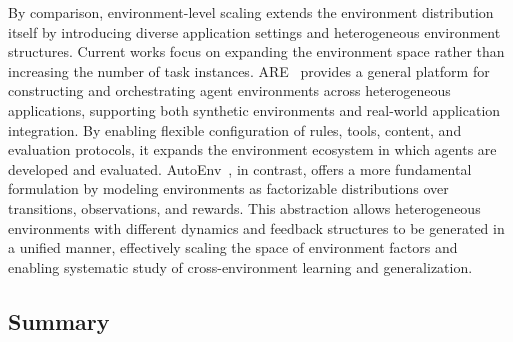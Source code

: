 By comparison, environment-level scaling extends the environment distribution itself by introducing diverse application settings and heterogeneous environment structures.
%
Current works focus on expanding the environment space rather than increasing the number of task instances.
%
ARE~\cite{ARE} provides a general platform for constructing and orchestrating agent environments across heterogeneous applications, supporting both synthetic environments and real-world application integration.
By enabling flexible configuration of rules, tools, content, and evaluation protocols, it expands the environment ecosystem in which agents are developed and evaluated.
%
AutoEnv~\cite{AutoEnv}, in contrast, offers a more fundamental formulation by modeling environments as factorizable distributions over transitions, observations, and rewards.
This abstraction allows heterogeneous environments with different dynamics and feedback structures to be generated in a unified manner, effectively scaling the space of environment factors and enabling systematic study of cross-environment learning and generalization.
%
%
\subsection{Summary}


